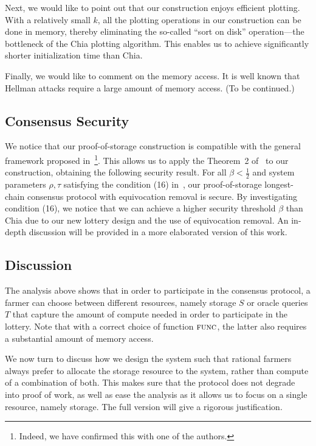 \documentclass[conference]{IEEEtran}
\newcommand{\func}{\textsc{func}}
\begin{document}
Next, we would like to point out that  our construction enjoys efficient plotting. With a relatively small $k$, all the plotting operations in our construction can be done in memory, thereby eliminating the so-called ``sort on disk'' operation---the bottleneck of the Chia plotting algorithm. This enables us to achieve significantly shorter initialization time than Chia.

Finally, we would like to comment on the memory access. It is well known that Hellman attacks require a large amount of memory access. (To be continued.) 

\subsection{Consensus Security}

We notice that our proof-of-storage construction is compatible with the general framework proposed in~\cite{blockchain_capacity}\footnote{Indeed, we have confirmed this with one of the authors.}. This allows us to apply the Theorem~2 of~\cite{blockchain_capacity} to our construction, obtaining the following security result.
For all $\beta < \frac{1}{2}$ and system parameters $\rho, \tau$ satisfying the condition (16) in~\cite{blockchain_capacity}, our proof-of-storage longest-chain consensus protocol with equivocation removal is secure. By investigating condition (16), we notice that we can achieve a higher security threshold $\beta$ than Chia due to our new lottery design and the use of equivocation removal. An in-depth discussion will be provided in a more elaborated version of this work.

\subsection{Discussion}

The analysis above shows that in order to participate in the consensus protocol, a farmer can choose between different resources, namely storage $S$ or oracle queries $T$ that capture the amount of compute needed in order to participate in the lottery. Note that with a correct choice of function $\func$, the latter also requires a substantial amount of memory access.

We now turn to discuss how we design the system such that rational farmers always prefer to allocate the storage resource to the system, rather than compute of a combination of both. This makes sure that the protocol does not degrade into proof of work, as well as ease the analysis as it allows us to focus on a single resource, namely storage. The full version will give a rigorous justification.
\end{document}
